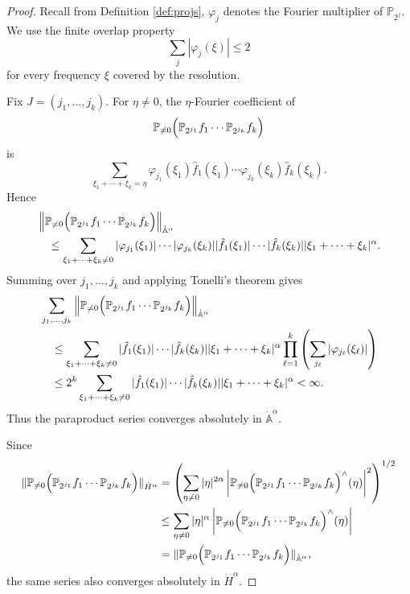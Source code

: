 \documentclass[12pt,reqno,letterpaper]{amsart}
\numberwithin{equation}{section}
\newcommand{\1}{{\bf 1}}
\newcommand{\2}{{\bf 2}}
\theoremstyle{remark}
\theoremstyle{remark}
\begin{document}
\begin{proof}
Recall from Definition \ref{def:projs}, $\varphi_j$ denotes the Fourier multiplier of $\mathbb P_{2^j}$. We use the finite overlap
property
\begin{equation*}
\sum_j |\varphi_j(\xi)|\le 2
\end{equation*}
for every frequency $\xi$ covered by the resolution.

Fix $J=(j_1,\ldots,j_k)$. For $\eta\neq0$, the $\eta$-Fourier coefficient
of
\[
\mathbb P_{\neq0}\Bigl(\mathbb P_{2^{j_1}}f_1\cdots \mathbb P_{2^{j_k}}f_k\Bigr)
\]
is
\[
\sum_{\xi_1+\cdots+\xi_k=\eta}
\varphi_{j_1}(\xi_1)\hat{f}_1(\xi_1)\cdots
\varphi_{j_k}(\xi_k)\hat{f}_k(\xi_k).
\]
Hence
\begin{align*}
&\left\|
\mathbb P_{\neq0}\Bigl(\mathbb P_{2^{j_1}}f_1\cdots \mathbb P_{2^{j_k}}f_k\Bigr)
\right\|_{\dot{\mathbb{A}}^\alpha}
\notag\\
&\quad \le
\sum_{\xi_1+\cdots+\xi_k\neq0}
|\varphi_{j_1}(\xi_1)|\cdots |\varphi_{j_k}(\xi_k)|
|\hat{f}_1(\xi_1)|\cdots|\hat{f}_k(\xi_k)|
|\xi_1+\cdots+\xi_k|^\alpha .
\end{align*}
Summing over $j_1,\ldots,j_k$ and applying Tonelli's theorem gives
\begin{align*}
&\sum_{j_1,\ldots,j_k}
\left\|
\mathbb P_{\neq0}\Bigl(\mathbb P_{2^{j_1}}f_1\cdots \mathbb P_{2^{j_k}}f_k\Bigr)
\right\|_{\dot{\mathbb{A}}^\alpha}
\\
&\quad\le
\sum_{\xi_1+\cdots+\xi_k\neq0}
|\hat{f}_1(\xi_1)|\cdots|\hat{f}_k(\xi_k)|
|\xi_1+\cdots+\xi_k|^\alpha
\prod_{\ell=1}^k
\left(\sum_{j_\ell}|\varphi_{j_\ell}(\xi_\ell)|\right)
\\
&\quad\le
2^k
\sum_{\xi_1+\cdots+\xi_k\neq0}
|\hat{f}_1(\xi_1)|\cdots|\hat{f}_k(\xi_k)|
|\xi_1+\cdots+\xi_k|^\alpha
<\infty.
\end{align*}
Thus the paraproduct series converges absolutely in $\dot{\mathbb{A}}^\alpha$.

Since
\[
\begin{aligned}
\|\mathbb P_{\neq0}\Bigl(\mathbb P_{2^{j_1}}f_1\cdots \mathbb P_{2^{j_k}}f_k\Bigr)\|_{\dot H^\alpha}
&=
\left(
\sum_{\eta\neq0}|\eta|^{2\alpha}\left|\mathbb P_{\neq0}\Bigl(\mathbb P_{2^{j_1}}f_1\cdots \mathbb P_{2^{j_k}}f_k\Bigr)^\wedge(\eta)\right|^2
\right)^{1/2}\\
&\le
\sum_{\eta\neq0}|\eta|^\alpha\left|\mathbb P_{\neq0}\Bigl(\mathbb P_{2^{j_1}}f_1\cdots \mathbb P_{2^{j_k}}f_k\Bigr)^\wedge(\eta)\right|\\
&=
\|\mathbb P_{\neq0}\Bigl(\mathbb P_{2^{j_1}}f_1\cdots \mathbb P_{2^{j_k}}f_k\Bigr)\|_{\dot{\mathbb{A}}^\alpha},
\end{aligned}
\]
the same series also converges absolutely in $\dot H^\alpha$.


\end{proof}
\end{document}
